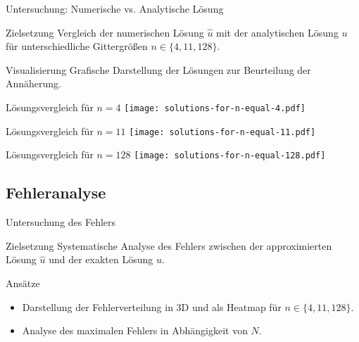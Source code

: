 \documentclass[9pt, t]{beamer}
\begin{document}
\begin{frame}{Untersuchung: Numerische vs. Analytische Lösung}
    \begin{block}{Zielsetzung}
        Vergleich der numerischen Lösung \(\hat u\) mit der analytischen Lösung \(u\)
        für unterschiedliche Gittergrößen \(n \in \{4, 11, 128\}\).
    \end{block}
    \pause%
    \begin{block}{Visualisierung}
        Grafische Darstellung der Lösungen zur Beurteilung der Annäherung.
    \end{block}
\end{frame}

\begin{frame}{Lösungsvergleich für \(n = 4\)}
    \centering
    \texttt{[image: solutions-for-n-equal-4.pdf]}
\end{frame}

\begin{frame}{Lösungsvergleich für \(n = 11\)}
    \centering
    \texttt{[image: solutions-for-n-equal-11.pdf]}
\end{frame}

\begin{frame}{Lösungsvergleich für \(n = 128\)}
    \centering
    \texttt{[image: solutions-for-n-equal-128.pdf]}
\end{frame}

%
\subsection{Fehleranalyse}

\begin{frame}{Untersuchung des Fehlers}
    \begin{block}{Zielsetzung}
        Systematische Analyse des Fehlers zwischen der approximierten Lösung \(\hat u\) und der exakten Lösung \(u\).
    \end{block}
    \pause%
    \begin{block}{Ansätze}
        \begin{itemize}[<+->]
            \item Darstellung der Fehlerverteilung in 3D und als Heatmap für
                  \(n \in \{4, 11, 128\}\).
            \item Analyse des maximalen Fehlers in Abhängigkeit von \(N\).
        \end{itemize}
    \end{block}
\end{frame}
\end{document}
